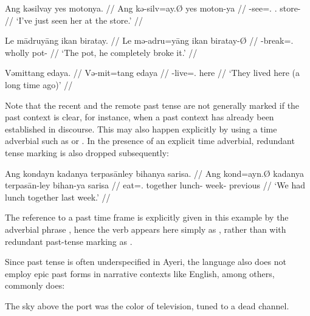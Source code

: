 \pex
\a\label{ex:npst}\begingl
	\gla Ang kəsilvay yes motonya. //
	\glb Ang kə-silv=ay.Ø yes moton-ya //
	\glc \AgtT{} \NPst{}-see=\Fsg{}.\Top{} \TsgF{}.\Parg{} store-\Loc{} //
	\glft `I've just seen her at the store.' //
\endgl

\a\label{ex:pst}\begingl
	\gla Le mādruyāng ikan biratay. //
	\glb Le mə-adru=yāng ikan biratay-Ø //
	\glc \PatTI{} \Pst{}-break=\TsgM{}.\Aarg{} wholly pot-\Top{} //
	\glft `The pot, he completely broke it.' //
\endgl

\a\label{ex:rpst}\begingl
	\gla Vəmittang edaya. //
	\glb Və-mit=tang edaya //
	\glc \RPst{}-live=\TplM{}.\Aarg{} here //
	\glft `They lived here (a long time ago)' //
\endgl

\xe

Note that the recent and the remote past tense are not generally marked if the 
past context is clear, for instance, when a past context has already been 
established in discourse. This may also happen explicitly by using a time 
adverbial such as  or . In the presence of an 
explicit time adverbial, redundant tense marking is also dropped subsequently:

\ex\begingl
	\gla Ang kondayn kadanya terpasānley bihanya sarisa. //
	\glb Ang kond=ayn.Ø kadanya terpasān-ley bihan-ya sarisa //
	\glc \AgtT{} eat=\Fpl{}.\Top{} together lunch-\PargI{} week-\Loc{}
		previous //
	\glft `We had lunch together last week.' //
\endgl\xe

The reference to a past time frame is explicitly given in this example by the 
adverbial phrase , hence the verb 
appears here simply as , rather than with redundant 
past-tense marking as .

Since past tense is often underspecified in Ayeri, the language also does not 
employ epic past forms in narrative contexts like English, among others, 
commonly does: 

\ex\label{ex:neuromancer}
	The sky above the port was the color of television, tuned to a dead 
	channel. 
\xe

